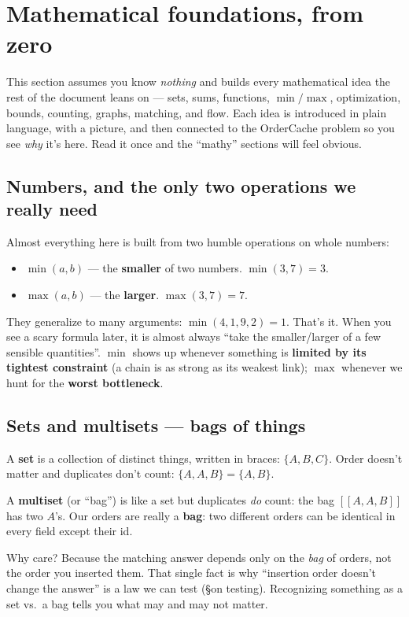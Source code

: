 \section{Mathematical foundations, from zero}

This section assumes you know \emph{nothing} and builds every mathematical idea the
rest of the document leans on --- sets, sums, functions, $\min/\max$, optimization,
bounds, counting, graphs, matching, and flow. Each idea is introduced in plain
language, with a picture, and then connected to the \textsf{OrderCache} problem so
you see \emph{why} it's here. Read it once and the ``mathy'' sections will feel
obvious.

\subsection{Numbers, and the only two operations we really need}

Almost everything here is built from two humble operations on whole numbers:

\begin{itemize}[leftmargin=1.5em]
  \item $\min(a,b)$ --- the \textbf{smaller} of two numbers. $\min(3,7)=3$.
  \item $\max(a,b)$ --- the \textbf{larger}. $\max(3,7)=7$.
\end{itemize}

They generalize to many arguments: $\min(4,1,9,2)=1$. That's it. When you see a
scary formula later, it is almost always ``take the smaller/larger of a few
sensible quantities''. $\min$ shows up whenever something is \textbf{limited by its
tightest constraint} (a chain is as strong as its weakest link); $\max$ whenever we
hunt for the \textbf{worst bottleneck}.

\subsection{Sets and multisets --- bags of things}

A \textbf{set} is a collection of distinct things, written in braces:
$\{A, B, C\}$. Order doesn't matter and duplicates don't count:
$\{A,A,B\}=\{A,B\}$.

A \textbf{multiset} (or ``bag'') is like a set but duplicates \emph{do} count:
the bag $[\![A,A,B]\!]$ has two $A$'s. Our orders are really a \textbf{bag}: two
different orders can be identical in every field except their id.

\begin{intu}
Why care? Because the matching answer depends only on the \emph{bag} of orders,
not the order you inserted them. That single fact is why ``insertion order doesn't
change the answer'' is a law we can test (\S on testing). Recognizing something as
a set vs.\ a bag tells you what may and may not matter.
\end{intu}

